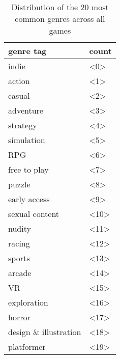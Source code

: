 \begin{table}[h]
    \centering
    \begin{tabular}{l|l}
    genre tag & count\\\hline
        indie                   & <0>\\
        action                  & <1>\\
        casual                  & <2>\\
        adventure               & <3>\\
        strategy                & <4>\\
        simulation              & <5>\\
        RPG                     & <6>\\
        free to play            & <7>\\
        puzzle                  & <8>\\
        early access            & <9>\\
        sexual content          & <10>\\
        nudity                  & <11>\\
        racing                  & <12>\\
        sports                  & <13>\\
        arcade                  & <14>\\
        VR                      & <15>\\
        exploration             & <16>\\
        horror                  & <17>\\
        design \& illustration  & <18>\\
        platformer              & <19>
    \end{tabular}
    \caption{Distribution of the 20 most common genres across all games}
    \label{tab:genre_metrics}
\end{table}